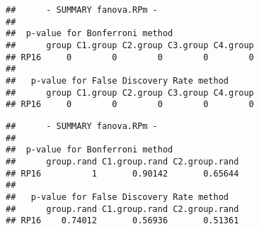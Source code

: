 \documentclass[
]{book}
\newenvironment{Shaded}{\begin{snugshade}}{\end{snugshade}}
\newcommand{\AttributeTok}[1]{\textcolor[rgb]{0.77,0.63,0.00}{#1}}
\newcommand{\CommentTok}[1]{\textcolor[rgb]{0.56,0.35,0.01}{\textit{#1}}}
\newcommand{\DecValTok}[1]{\textcolor[rgb]{0.00,0.00,0.81}{#1}}
\newcommand{\FunctionTok}[1]{\textcolor[rgb]{0.00,0.00,0.00}{#1}}
\newcommand{\NormalTok}[1]{#1}
\newcommand{\OtherTok}[1]{\textcolor[rgb]{0.56,0.35,0.01}{#1}}
\newcommand{\SpecialCharTok}[1]{\textcolor[rgb]{0.00,0.00,0.00}{#1}}
\begin{document}
\begin{verbatim}
##      - SUMMARY fanova.RPm - 
## 
##  p-value for Bonferroni method 
##      group C1.group C2.group C3.group C4.group
## RP16     0        0        0        0        0
## 
##   p-value for False Discovery Rate method 
##      group C1.group C2.group C3.group C4.group
## RP16     0        0        0        0        0
\end{verbatim}

\begin{Shaded}
\end{Shaded}

\begin{verbatim}
##      - SUMMARY fanova.RPm - 
## 
##  p-value for Bonferroni method 
##      group.rand C1.group.rand C2.group.rand
## RP16          1       0.90142       0.65644
## 
##   p-value for False Discovery Rate method 
##      group.rand C1.group.rand C2.group.rand
## RP16    0.74012       0.56936       0.51361
\end{verbatim}

\newcommand{\al}{\mbox{$\alpha$}}
\newcommand{\be}{\mbox{$\beta$}}
\newcommand{\ep}{\mbox{$\epsilon$}}
\newcommand{\gam}{\mbox{$\gamma$}}
\newcommand{\sig}{\mbox{$\sigma$}}

\newcommand{\calA}{\mbox{${\cal A}$}}
\newcommand{\calB}{\mbox{${\cal B}$}}
\newcommand{\calC}{\mbox{${\cal C}$}}

\newcommand{\Nat}{\mbox{$\mathbb{N}$}}
\newcommand{\Rea}{\mbox{$\mathbb{R}$}}
\newcommand{\Prob}{\mbox{$\mathbf{P}$}}
\newcommand{\ProbQ}{\mbox{$\mathbf{Q}$}}

\newcommand{\nin}{\mbox{$n \in \mathbb{N}$}}
\newcommand{\suc}{\mbox{$\{X_{n}\}$}}
\newcommand{\sucP}{\mbox{$\mathbb{P}_{n}\}$}

\newcommand{\conv}{\rightarrow}
\newcommand{\convn}{\rightarrow_{n\rightarrow \infty}}
\newcommand{\convp}{\rightarrow_{\mbox{c.p.}}}
\newcommand{\convs}{\rightarrow_{\mbox{a.s.}}}
\newcommand{\convw}{\rightarrow_al D}{\rightarrow}}
\newcommand{\R}{\mathbb{R}}
\newcommand{\Rn}{\mathbb{R}^n}
\newcommand{\PR}{\mathbb{P}}
\end{document}
